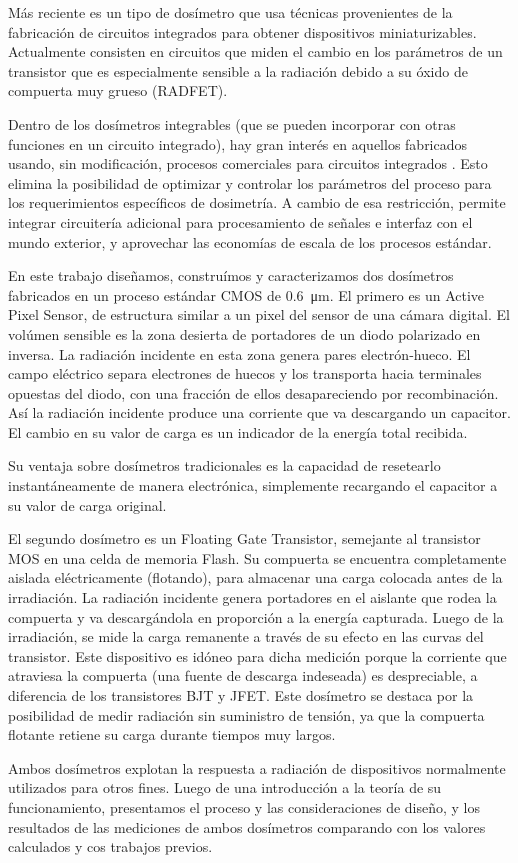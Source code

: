 Más reciente es un tipo de dosímetro que usa técnicas 
provenientes de la fabricación de circuitos integrados 
para obtener dispositivos 
miniaturizables\cite{holmes-siedle_radfet:_1986}.
Actualmente consisten en circuitos que miden el 
cambio en los parámetros de un transistor que es
especialmente sensible a la radiación 
debido a su óxido de compuerta muy grueso (RADFET).

Dentro de los dosímetros integrables 
(que se pueden incorporar con otras funciones en un circuito integrado),
hay gran interés en aquellos fabricados usando, sin modificación,
procesos comerciales para circuitos integrados\cite{lipovetzky_field_2013}
\cite{wang_temperature_2005}
\cite{garcia-moreno_floating_2012}
\cite{dulinski_cmos_2004}.
Esto elimina la posibilidad de optimizar y controlar 
los parámetros del proceso 
para los requerimientos específicos de dosimetría.
A cambio de esa restricción, 
permite integrar circuitería adicional
para procesamiento de señales e interfaz con el mundo exterior,
y aprovechar las economías de escala de los procesos estándar.

En este trabajo diseñamos, construímos y caracterizamos
dos dosímetros fabricados en un proceso estándar CMOS de
\SI{0.6}{\micro\meter}.
El primero es un Active Pixel Sensor,
de estructura similar a un pixel del sensor de una cámara digital.
El volúmen sensible es la zona desierta de portadores 
de un diodo polarizado en inversa.
La radiación incidente en esta zona genera pares electrón-hueco.
El campo eléctrico separa electrones de huecos y los transporta hacia
terminales opuestas del diodo,
con una fracción de ellos desapareciendo por recombinación.
Así la radiación incidente produce una corriente que va
descargando un capacitor.
El cambio en su valor de carga es un indicador de la energía total recibida.

Su ventaja sobre dosímetros tradicionales es la capacidad de resetearlo
instantáneamente de manera electrónica,
simplemente recargando el capacitor a su valor de carga original.

El segundo dosímetro es un Floating Gate Transistor,
semejante al transistor MOS en una celda de memoria Flash.
Su compuerta se encuentra completamente aislada eléctricamente (flotando),
para almacenar una carga colocada antes de la irradiación.
La radiación incidente genera portadores en el aislante que rodea la compuerta
y va descargándola en proporción a la energía capturada.
Luego de la irradiación,
se mide la carga remanente a través de su efecto en las curvas del transistor.
Este dispositivo es idóneo para dicha medición
porque la corriente que atraviesa la compuerta 
(una fuente de descarga indeseada) es despreciable,
a diferencia de los transistores BJT y JFET.
Este dosímetro se destaca por la posibilidad de medir radiación sin suministro
de tensión, ya que la compuerta flotante retiene su carga durante tiempos muy
largos.

Ambos dosímetros explotan la respuesta a radiación de dispositivos 
normalmente utilizados para otros fines. 
Luego de una introducción a la teoría de su funcionamiento,
presentamos el proceso y las consideraciones de diseño,
y los resultados de las mediciones de ambos dosímetros 
comparando con los valores calculados y cos trabajos previos.
